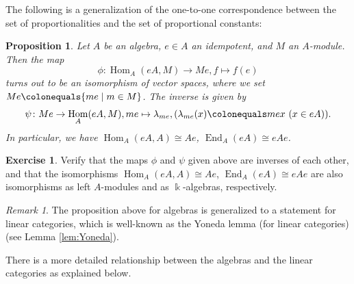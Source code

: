 \documentclass{surv-l}
\numberwithin{equation}{chapter}
\numberwithin{figure}{chapter}
\theoremstyle{plain}
\newtheorem{prp}[thm]{Proposition}
\theoremstyle{definition}
\newtheorem{exc}[thm]{Exercise}
\theoremstyle{remark}
\newtheorem{rmk}[thm]{Remark}
\DeclareMathOperator{\Hom}{Hom}
\DeclareMathOperator{\End}{End}
\begin{document}
The following is a generalization of the one-to-one correspondence between
the set of proportionalities and the set of proportional constants:

\begin{prp}\label{prp:hirei-hireiteisuu-ippannka}
Let $A$ be an algebra, $e \in A$ an idempotent, and
$M$ an $A$-module.
Then the map
\[
\phi\colon \Hom_A(eA, M) \to Me, f \mapsto f(e)
\]
turns out to be an isomorphism of vector spaces,
where we set $Me\colonequals \{me \mid m \in M\}$.
The inverse is given by
\[
\psi\colon Me \to \Hom_A(eA, M), me \mapsto \lambda_{me}, (\lambda_{me}(x)\colonequals mex\ (x \in eA)).
\]
In particular, we have $\Hom_A(eA, A) \cong Ae$, $\End_A(eA) \cong eAe$.
\end{prp}

\begin{exc}
Verify that the maps $\phi$ and $\psi$ given above are inverses of each other,
and that the isomorphisms
$\Hom_A(eA, A) \cong Ae$, $\End_A(eA) \cong eAe$
are also isomorphisms as left $A$-modules and as $\Bbbk$-algebras,
respectively.
\end{exc}

\begin{rmk}
The proposition above for algebras is generalized to a statement for
linear categories, which is well-known as the Yoneda lemma
(for linear categories) (see Lemma \ref{lem:Yoneda}).
\end{rmk}

There is a more detailed relationship between the algebras
and the linear categories as explained below.
\end{document}
